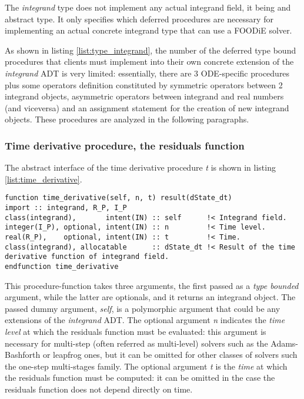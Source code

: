 \documentclass[pdftex,preprint,3p,times,numbers]{elsarticle}
\begin{document}
The \emph{integrand} type does not implement any actual integrand field, it being and abstract type. It only specifies which deferred procedures are necessary for implementing an actual concrete integrand type that can use a FOODiE solver.

As shown in listing \ref{list:type_integrand}, the number of the deferred type bound procedures that clients must implement into their own concrete extension of the \emph{integrand} ADT is very limited: essentially, there are 3 ODE-specific procedures plus some operators definition constituted by symmetric operators between 2 integrand objects, asymmetric operators between integrand and real numbers (and viceversa) and an assignment statement for the creation of new integrand objects. These procedures are analyzed in the following paragraphs.

\subsubsection{Time derivative procedure, the residuals function}

The abstract interface of the time derivative procedure \emph{t} is shown in listing \ref{list:time_derivative}.

\begin{lstlisting}[firstnumber=1,style=code,caption={time derivative procedure interface},label={list:time_derivative}]
function time_derivative(self, n, t) result(dState_dt)
import :: integrand, R_P, I_P
class(integrand),       intent(IN) :: self      !< Integrand field.
integer(I_P), optional, intent(IN) :: n         !< Time level.
real(R_P),    optional, intent(IN) :: t         !< Time.
class(integrand), allocatable      :: dState_dt !< Result of the time derivative function of integrand field.
endfunction time_derivative
\end{lstlisting}

This procedure-function takes three arguments, the first passed as a \emph{type bounded} argument, while the latter are optionals, and it returns an integrand object. The passed dummy argument, \emph{self}, is a polymorphic argument that could be any extensions of the \emph{integrand} ADT. The optional argument \emph{n} indicates the \emph{time level} at which the residuals function must be evaluated: this argument is necessary for multi-step (often referred as multi-level) solvers such as the Adams-Bashforth or leapfrog ones, but it can be omitted for other classes of solvers such the one-step multi-stages family. The optional argument \emph{t} is the \emph{time} at which the residuals function must be computed: it can be omitted in the case the residuals function does not depend directly on time.
\end{document}
